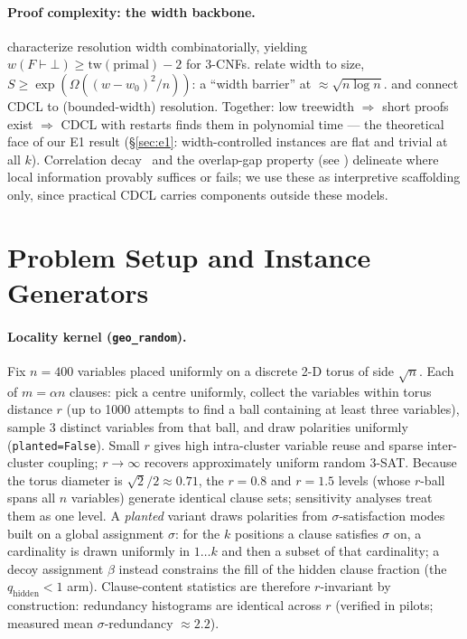 \documentclass[manuscript, screen, review]{jair}
\begin{document}
\paragraph{Proof complexity: the width backbone.}
\citet{atserias2008} characterize resolution width
combinatorially, yielding $w(F\vdash\bot) \ge \mathrm{tw}(\text{primal}) - 2$
for 3-CNFs.
\citet{ben1999} relate width to size,
$S \ge \exp(\Omega((w-w_0)^2/n))$: a ``width barrier'' at
${\approx}\sqrt{n\log n}$. \citet{atserias2011} and
\citet{beame2003} connect CDCL to (bounded-width) resolution.
Together: low treewidth $\Rightarrow$ short proofs exist $\Rightarrow$
CDCL with restarts finds them in polynomial time --- the theoretical face of
our E1 result (\S\ref{sec:e1}: width-controlled instances are flat and
trivial at all $k$).
Correlation decay~\cite{weitz2006} and the overlap-gap property
(see \parencite{gamarnik2021}) delineate where local information provably suffices
or fails; we use these as interpretive scaffolding only, since practical CDCL
carries components outside these models.

\section{Problem Setup and Instance Generators}
\label{sec:setup}

\paragraph{Locality kernel (\texttt{geo\_random}).}
Fix $n=400$ variables placed uniformly on a discrete 2-D torus of side
$\sqrt{n}$. Each of $m=\alpha n$ clauses: pick a centre uniformly, collect the
variables within torus distance $r$ (up to 1000 attempts to find a ball
containing at least three variables), sample 3 distinct variables from that
ball, and draw polarities uniformly
(\texttt{planted=False}). Small $r$ gives high intra-cluster variable reuse
and sparse inter-cluster coupling; $r\to\infty$ recovers approximately uniform
random 3-SAT. Because the torus diameter is ${\sqrt{2}}/{2}\approx0.71$, the
$r{=}0.8$ and $r{=}1.5$ levels (whose $r$-ball spans all $n$ variables)
generate identical clause sets; sensitivity analyses treat them as one level.
A \emph{planted} variant draws polarities from
$\sigma$-satisfaction modes built on a global assignment $\sigma$: for the
$k$ positions a clause satisfies $\sigma$ on, a cardinality is drawn uniformly
in $1\ldots k$ and then a subset of that cardinality; a decoy assignment
$\beta$ instead constrains the fill of the hidden clause fraction (the
$q_{\text{hidden}}<1$ arm). Clause-content statistics are therefore
$r$-invariant by construction: redundancy histograms are identical across $r$
(verified in pilots; measured mean $\sigma$-redundancy ${\approx}2.2$).
\end{document}
